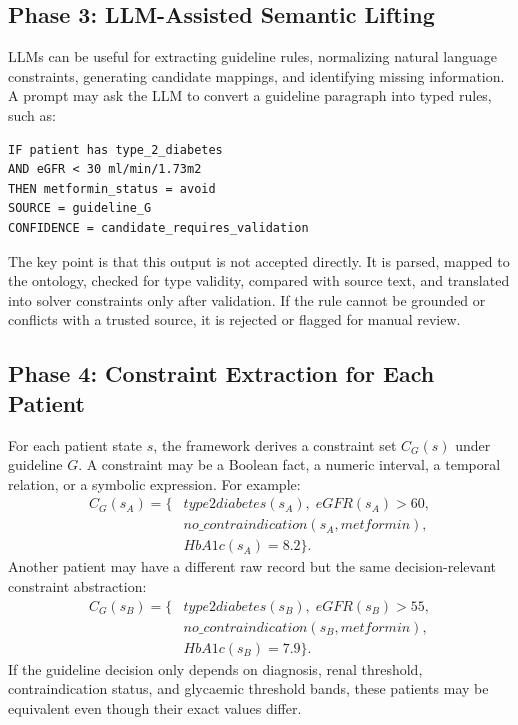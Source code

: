 \documentclass[english,5p,twocolumn,preprint]{elsarticle}
\begin{document}
\subsection{Phase 3: LLM-Assisted Semantic Lifting}
LLMs can be useful for extracting guideline rules, normalizing natural language constraints, generating candidate mappings, and identifying missing information. A prompt may ask the LLM to convert a guideline paragraph into typed rules, such as:

\begin{lstlisting}[language={},caption={Illustrative rule extracted from a guideline paragraph.}]
IF patient has type_2_diabetes
AND eGFR < 30 ml/min/1.73m2
THEN metformin_status = avoid
SOURCE = guideline_G
CONFIDENCE = candidate_requires_validation
\end{lstlisting}

The key point is that this output is not accepted directly. It is parsed, mapped to the ontology, checked for type validity, compared with source text, and translated into solver constraints only after validation. If the rule cannot be grounded or conflicts with a trusted source, it is rejected or flagged for manual review.

\subsection{Phase 4: Constraint Extraction for Each Patient}
For each patient state $s$, the framework derives a constraint set $C_G(s)$ under guideline $G$. A constraint may be a Boolean fact, a numeric interval, a temporal relation, or a symbolic expression. For example:
\begin{align}
C_G(s_A) = \{& type2diabetes(s_A),\; eGFR(s_A) > 60,\\
              & no\_contraindication(s_A, metformin),\\
              & HbA1c(s_A)=8.2\}.
\end{align}
Another patient may have a different raw record but the same decision-relevant constraint abstraction:
\begin{align}
C_G(s_B) = \{& type2diabetes(s_B),\; eGFR(s_B) > 55,\\
              & no\_contraindication(s_B, metformin),\\
              & HbA1c(s_B)=7.9\}.
\end{align}
If the guideline decision only depends on diagnosis, renal threshold, contraindication status, and glycaemic threshold bands, these patients may be equivalent even though their exact values differ.
\end{document}
